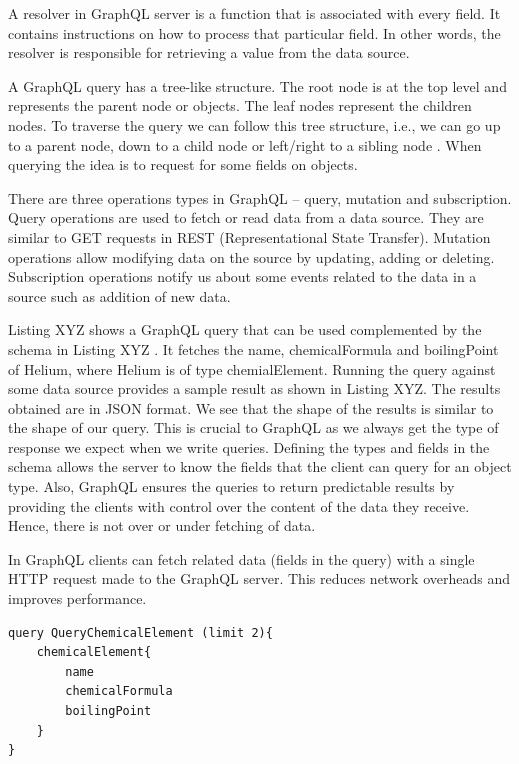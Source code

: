 A resolver in GraphQL server is a function that is associated with every field. It contains instructions on how to process that particular field. In other words, the resolver is responsible for retrieving a value from the data source.
 
A GraphQL query has a tree-like structure. The root node is at the top level and represents the parent node or objects. The leaf nodes represent the children nodes. To traverse the query we can follow this tree structure, i.e., we can go up to a parent node, down to a child node or left/right to a sibling node \cite{Perez2009}. When querying the idea is to request for some fields on objects.

There are three operations types in GraphQL – query, mutation and subscription. Query operations are used to fetch or read data from a data source. They are similar to GET requests in REST (Representational State Transfer). Mutation operations allow modifying data on the source by updating, adding or deleting. Subscription operations notify us about some events related to the data in a source such as addition of new data.

Listing XYZ shows a GraphQL query that can be used complemented by the schema in Listing XYZ . It fetches the name, chemicalFormula and boilingPoint of Helium, where Helium is of type chemialElement. Running the query against some data source provides a sample result as shown in Listing XYZ. The results obtained are in JSON format. We see that the shape of the results is similar to the shape of our query. This is crucial to GraphQL as we always get the type of response we expect when we write queries. Defining the types and fields in the schema allows the server to know the fields that the client can query for an object type. Also, GraphQL ensures the queries to return predictable results by providing the clients with control over the content of the data they receive. Hence, there is not over or under fetching of data.

In GraphQL clients can fetch related data (fields in the query) with a single HTTP request made to the GraphQL server. This reduces network overheads and improves performance.



\begin{minipage}{\linewidth}
\begin{lstlisting}[label=listing:listing5, caption={Query to fetch chemical elements and their properties}]
query QueryChemicalElement (limit 2){
    chemicalElement{
		name
		chemicalFormula
		boilingPoint
	}
}
\end{lstlisting}
\end{minipage}

